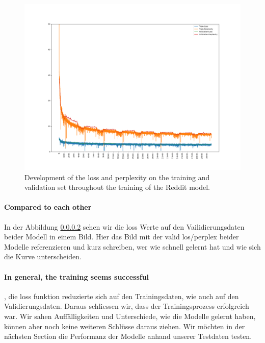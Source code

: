 \begin{figure}[H]
	\includegraphics[width=\linewidth]{img/plots/reddit/train_metrics.png}
	\caption{Development of the loss and perplexity on the training and validation set throughout the training of the Reddit model.}
	\label{results:learning_process:metrics:reddit}
\end{figure}

\paragraph{Compared to each other} In der Abbildung \ref{} sehen wir die loss Werte auf den Vailidierungsdaten beider Modell in einem Bild. Hier das Bild mit der valid los/perplex beider Modelle referenzieren und kurz schreiben, wer wie schnell gelernt hat und wie sich die Kurve unterscheiden.

\paragraph{In general, the training seems successful}, die loss funktion reduzierte sich auf den Trainingsdaten, wie auch auf den Validierungsdaten. Daraus schliessen wir, dass der Trainingsprozess erfolgreich war. Wir sahen Auffälligkeiten und Unterschiede, wie die Modelle gelernt haben, können aber noch keine weiteren Schlüsse daraus ziehen. Wir möchten in der nächsten Section die Performanz der Modelle anhand unserer Testdaten testen.

